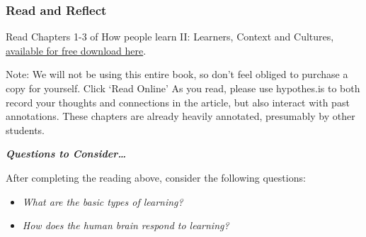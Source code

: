 \documentclass[
]{book}
\providecommand{\tightlist}{%
  \setlength{\itemsep}{0pt}\setlength{\parskip}{0pt}}
\begin{document}
\begin{reflect}
\hypertarget{read-and-reflect}{%
\subsubsection{Read and Reflect}\label{read-and-reflect}}

Read Chapters 1-3 of How people learn II: Learners, Context and Cultures, \href{https://www.nap.edu/catalog/24783}{available for free download here}.

Note: We will not be using this entire book, so don't feel obliged to purchase a copy for yourself.
Click `Read Online' As you read, please use hypothes.is to both record your thoughts and connections in the article, but also interact with past annotations. These chapters are already heavily annotated, presumably by other students.

\textbf{\emph{Questions to Consider\ldots{}}}

After completing the reading above, consider the following questions:

\begin{itemize}
\tightlist
\item
  \emph{What are the basic types of learning?}
\item
  \emph{How does the human brain respond to learning?}
\end{itemize}
\end{reflect}
\end{document}
